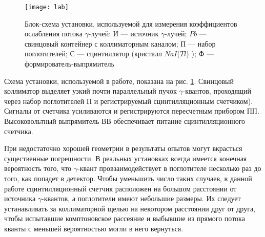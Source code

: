 \begin{figure}[h!]
  \centering
  \texttt{[image: lab]}
  \caption{Блок-схема установки, используемой для измерения коэффициентов
    ослабления потока $\gamma$-лучей: И --- источник $\gamma$-лучей; $Pb$ ---
    свинцовый контейнер с коллиматорным каналом; П --- набор поглотителей; С ---
    сцинтиллятор (кристалл $NaI$($Tl$) ); Ф --- формирователь-выпрямитель}
  \label{ris lab}
\end{figure}

Схема установки, используемой в работе, показана на рис. \ref{ris lab}.
Свинцовый коллиматор выделяет узкий почти параллельный пучок $\gamma$-квантов,
проходящий через набор поглотителей П и регистрируемый сцинтилляционным
счетчиком). Сигналы от счетчика усиливаются и регистрируются пересчетным
прибором ПП. Высоковольтный выпрямитель ВВ обеспечивает питание
сцинтилляционного счетчика.

При недостаточно хорошей геометрии в результаты опытов могут вкрасться
существенные погрешности. В реальных установках всегда имеется конечная
вероятность того, что $\gamma$-квант провзаимодействует в поглотителе несколько
раз до того, как попадет в детектор. Чтобы уменьшить число таких случаев, в
данной работе сцинтилляционный счетчик расположен на большом расстоянии от
источника $\gamma$-квантов, а поглотители имеют небольшие размеры. Их следует
устанавливать за коллиматорной щелью на некотором расстоянии друг от друга,
чтобы испытавшие комптоновское рассеяние и выбывшие из прямого потока кванты с
меньшей вероятностью могли в него вернуться.
